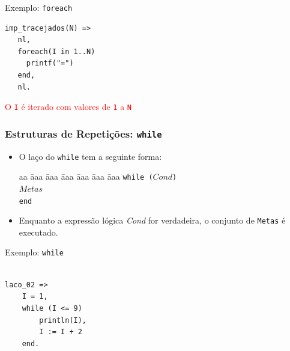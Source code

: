 \begin{frame}[fragile]

\begin{block}{Exemplo: \texttt{foreach} }
     
\begin{lstlisting}[frame=single]
 imp_tracejados(N) =>
   nl,
   foreach(I in 1..N)
     printf("=")
   end,
   nl.   
\end{lstlisting}
        
\end{block}

\textcolor{red}{O \texttt{I} é iterado com valores de \texttt{1} a \texttt{N}}
\end{frame}    


\begin{frame}[fragile]
\frametitle{Estruturas de Repetições: \texttt{while}}


\begin{itemize}
        \item O laço do \texttt{while} tem a seguinte forma:
        
        \begin{tabbing}
            aa \= aaa \= aaa \= aaa \= aaa \= aaa \= aaa \kill
            \> \texttt{while ($Cond$)} \\
            \> \> $Metas$  \\
            \>  \texttt{end}
        \end{tabbing} 
        
        \item Enquanto a expressão lógica \emph{Cond} for verdadeira, o conjunto de \texttt{Metas} é executado.
        
\end{itemize}
\end{frame}    


\begin{frame}[fragile]

\begin{block}{Exemplo: \texttt{while} }
     
\begin{lstlisting}[frame=single]
  
laco_02 =>  
    I = 1,  
    while (I <= 9)  
        println(I),  
        I := I + 2  
    end.  
\end{lstlisting}
        
\end{block}
\end{frame}    

